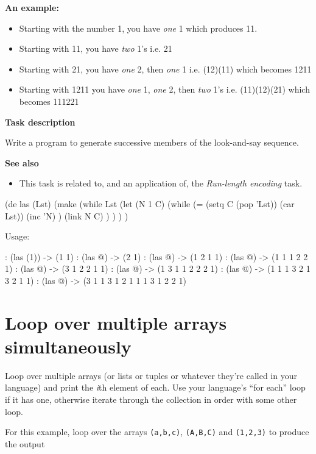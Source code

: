 \begin{itemize}
\textbf{An example:}

\begin{itemize}
\item
  Starting with the number 1, you have \emph{one} 1 which produces 11.
\item
  Starting with 11, you have \emph{two} 1's i.e. 21
\item
  Starting with 21, you have \emph{one} 2, then \emph{one} 1 i.e.
  (12)(11) which becomes 1211
\item
  Starting with 1211 you have \emph{one} 1, \emph{one} 2, then
  \emph{two} 1's i.e. (11)(12)(21) which becomes 111221
\end{itemize}

\textbf{Task description}

Write a program to generate successive members of the look-and-say
sequence.

\textbf{See also}

\begin{itemize}
\item
  This task is related to, and an application of, the
  \emph{Run-length encoding} task.
\end{itemize}


\begin{wideverbatim}

(de las (Lst)
   (make
      (while Lst
         (let (N 1  C)
            (while (= (setq C (pop 'Lst)) (car Lst))
               (inc 'N) )
            (link N C) ) ) ) )

Usage:

: (las (1))
-> (1 1)
: (las @)
-> (2 1)
: (las @)
-> (1 2 1 1)
: (las @)
-> (1 1 1 2 2 1)
: (las @)
-> (3 1 2 2 1 1)
: (las @)
-> (1 3 1 1 2 2 2 1)
: (las @)
-> (1 1 1 3 2 1 3 2 1 1)
: (las @)
-> (3 1 1 3 1 2 1 1 1 3 1 2 2 1)

\end{wideverbatim}

\pagebreak{}
\section*{Loop over multiple arrays simultaneously}


Loop over multiple arrays (or lists or tuples or whatever they're called
in your language) and print the \emph{i}th element of each. Use your
language's ``for each'' loop if it has one, otherwise iterate through
the collection in order with some other loop.

For this example, loop over the arrays \texttt{(a,b,c)},
\texttt{(A,B,C)} and \texttt{(1,2,3)} to produce the output


\end{itemize}
